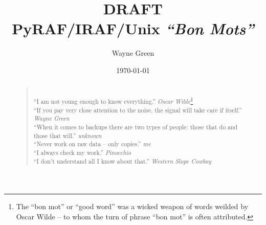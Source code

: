 \documentclass[letter,11pt,oneside]{article}
\begin{document}
\setlength{\footskip}{13.59999pt}


\pagecolor{yellow}
\title{\vspace{0.5cm}
{\huge DRAFT} \\
PyRAF/IRAF/Unix \emph{``Bon Mots''}\\
{\color{darkred}{PyRAF does not work for you,\\
it works with you!}}}

\author{\vspace{-0.5cm} Wayne Green}
\date{\vspace{-0.5cm} \today}
\maketitle

\begin{abstract}
{\color{darkgreen}
\begin{quote}
~\\
``I am not young enough to know everything.'' {\small \emph{Oscar
    Wilde}\footnote{The ``bon mot'' or ``good word'' was a wicked weapon
of words weilded by Oscar Wilde -- to whom the turn of phrase ``bon
mot'' is often attributed.}}
\\
``If you pay very close attention to the noise, the signal will take care if itself.''
{\small \emph{Wayne Green}}
\\
``When it comes to backups there are two types of people: those that do
and those that will.'' {\small \emph{unknown}}
\\
``Never work on raw data -- only copies.'' {\small \emph{me}}
\\
``I always check my work.'' {\small \emph{Pinocchio}}
\\
``I don't understand all I know about that.'' {\small \emph{Western Slope Cowboy}}
\end{quote}
}
\end{abstract}
\clearpage
\pagecolor{white}



\end{document}
